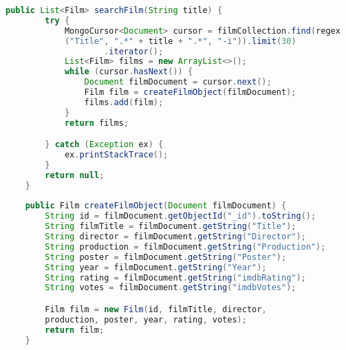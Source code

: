 \begin{lstlisting}[language=Java,  basicstyle=\footnotesize]
	public List<Film> searchFilm(String title) {
		try {
			MongoCursor<Document> cursor = filmCollection.find(regex
			("Title", ".*" + title + ".*", "-i")).limit(30)
					.iterator();
			List<Film> films = new ArrayList<>();
			while (cursor.hasNext()) {
				Document filmDocument = cursor.next();
				Film film = createFilmObject(filmDocument);
				films.add(film);
			}
			return films;

		} catch (Exception ex) {
			ex.printStackTrace();
		}
		return null;
	}
	
	public Film createFilmObject(Document filmDocument) {
		String id = filmDocument.getObjectId("_id").toString();
		String filmTitle = filmDocument.getString("Title");
		String director = filmDocument.getString("Director");
		String production = filmDocument.getString("Production");
		String poster = filmDocument.getString("Poster");
		String year = filmDocument.getString("Year");
		String rating = filmDocument.getString("imdbRating");
		String votes = filmDocument.getString("imdbVotes");

		Film film = new Film(id, filmTitle, director,
		production, poster, year, rating, votes);
		return film;
	}
\end{lstlisting}